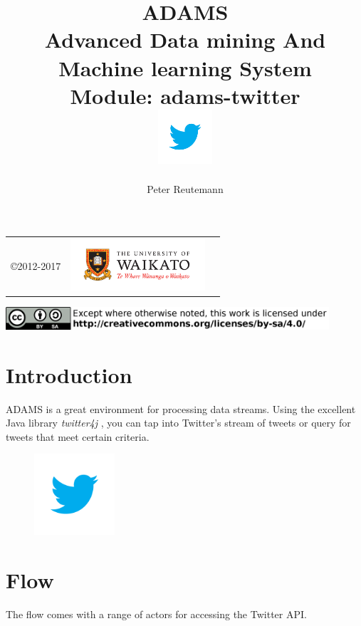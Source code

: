 \documentclass[a4paper]{book}
\title{
  \textbf{ADAMS} \\
  {\Large \textbf{A}dvanced \textbf{D}ata mining \textbf{A}nd \textbf{M}achine
  learning \textbf{S}ystem} \\
  {\Large Module: adams-twitter} \\
  \vspace{1cm}
  \includegraphics[width=2cm]{images/twitter-bird-blue-on-white.png} \\
}
\author{
  Peter Reutemann
}
\begin{document}
\begin{titlepage}
\maketitle

\thispagestyle{empty}
\center
\begin{table}[b]
	\begin{tabular}{c l l}
		\parbox[c][2cm]{2cm}{\copyright 2012-2017} &
		\parbox[c][2cm]{5cm}{\includegraphics[width=5cm]{images/coat_of_arms.pdf}} \\
	\end{tabular}
	\includegraphics[width=12cm]{images/cc.png} \\
\end{table}

\end{titlepage}

\tableofcontents
\listoffigures

\chapter{Introduction}
ADAMS is a great environment for processing data streams. Using the excellent
Java library \textit{twitter4j} \cite{twitter4j}, you can tap into Twitter's 
stream of tweets or query for tweets that meet certain criteria.

\begin{figure}[htb]
  \centering
  \includegraphics[width=3.0cm]{images/twitter-bird-blue-on-white.png}
\end{figure}

\chapter{Flow}
The flow comes with a range of actors for accessing the Twitter API.
\end{document}
